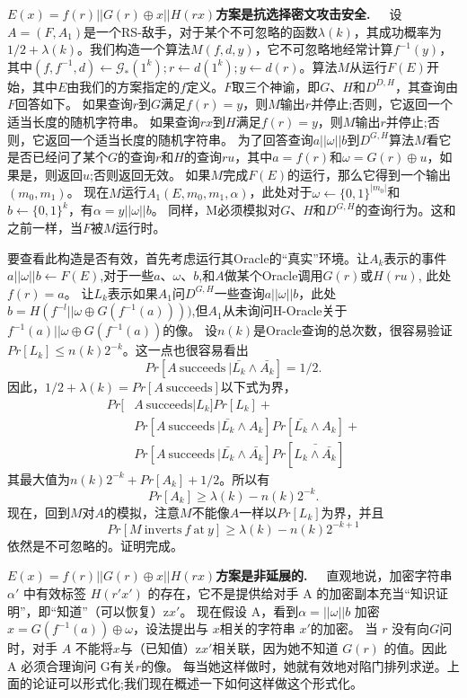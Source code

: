 \documentclass[]{article}
\begin{document}
    \textbf{$E(x)=f(r)||G(r)\oplus x || H(rx)$方案是抗选择密文攻击安全.}\ \ \ 
    设$A = (F, A_1)$是一个RS-敌手，对于某个不可忽略的函数$\lambda(k)$，其成功概率为$1/2 + \lambda(k)$。我们构造一个算法$M(f,d,y)$，它不可忽略地经常计算$f^{-1}(y)$，其中$(f,f^{-1},d)\leftarrow \mathcal{G}_*(1^k);r\leftarrow d(1^k);y\leftarrow d(r)$。算法$M$从运行$F(E)$开始，其中$E$由我们的方案指定的$f$定义。$F$取三个神谕，即$G$、$H$和$D^ {D,H}$，其查询由$F$回答如下。
    如果查询$r$到$G$满足$f(r)=y$，则$M$输出$r$并停止;否则，它返回一个适当长度的随机字符串。
    如果查询$rx$到$H$满足$f(r) = y$，则$M$输出$r$并停止;否则，它返回一个适当长度的随机字符串。
    为了回答查询$a || \omega || b$到$D ^{G,H}$算法$M$看它是否已经问了某个$G$的查询$r$和$H$的查询$ru$，其中$a = f (r)$和$\omega = G(r)\oplus u$，如果是，则返回$u$;否则返回无效。
    如果$M$完成$F(E)$的运行，那么它得到一个输出$(m_0,m_1)$。
    现在$M$运行$A_1(E,m_0,m_1,\alpha)$，此处对于$\omega \leftarrow \{0,1\}^{|m_0|}$和$b\leftarrow \{0,1\}^k$，有$\alpha=y || \omega || b$。
    同样，M必须模拟对$G$、$H$和$D^{G,H}$的查询行为。这和之前一样，当$F$被$M$运行时。
    \par
    
    要查看此构造是否有效，首先考虑运行其Oracle的“真实”环境。让$A_k$表示的事件$a || \omega || b\leftarrow F(E)$,对于一些$a$、$\omega$、$b$,和$A$做某个Oracle调用$G(r)$或$H(ru)$, 此处$f(r)=a$。
    让$L_k$表示如果$A_1$问$D^{G,H}$一些查询$a||\omega||b$，此处 $b = H(f^{-l}|| \omega \oplus G(f^{-1}(a))))$,但$A_1$从未询问H-Oracle关于$f^{-1}(a)||\omega \oplus G(f^{-1}(a))$的像。
    设$n(k)$是Oracle查询的总次数，很容易验证$Pr[L_k]\leq n(k)2^{-k}$。这一点也很容易看出
    \[Pr[A\ \text{succeeds}\ | \bar{L_k} \wedge \bar{A_k} ]=1/2.\]
    因此，$1/2 + \lambda(k) = Pr [A\ \text{succeeds}]$以下式为界，
    \begin{align*}
    	Pr[&A\ \text{succeeds} | L_k] Pr[L_k]+\\
    	   &Pr[A\ \text{succeeds}\ | \bar{L_k} \wedge A_k]Pr[\bar{L_k}\wedge A_k]+\\
    	   &Pr[A\ \text{succeeds}\ | \bar{L_k}\wedge \bar{A_k}]Pr[\bar{L_k\wedge \bar{A_k}}]
    \end{align*}
    其最大值为$n(k)2^{-k}+Pr[A_k]+1/2$。所以有
    \[Pr[A_k]\geq \lambda(k)-n(k)2^{-k}.\]
    现在，回到$M$对$A$的模拟，注意$M$不能像$A$一样以$Pr[L_k]$为界，并且
    \[Pr[M\ \text{inverts}\ f \ \text{at}\ y] \geq \lambda(k)-n(k)2^{-k+1}\]
    依然是不可忽略的。证明完成。
    \par
    
    \textbf{$E(x)=f(r)||G(r)\oplus x || H(rx)$方案是非延展的.}\ \ \ 
    直观地说，加密字符串 $\alpha'$ 中有效标签 $H(r'x')$ 的存在，它不是提供给对手 A 的加密副本充当“知识证明”，即“知道”（可以恢复）z$x'$。
    现在假设 A，看到$\alpha =||\omega || b$ 加密 $x=G(f^{-1}(a))\oplus \omega$，设法提出与 $x$相关的字符串 $x'$的加密。
    当 $r$ 没有向$G$问时，对手 $A$ 不能将$x$与（已知值）z$x'$相关联，因为她不知道 $G(r)$ 的值。因此 A 必须合理询问 G有关$r$的像。
    每当她这样做时，她就有效地对陷门排列求逆。上
    面的论证可以形式化;我们现在概述一下如何这样做这个形式化。
    \par
    
\end{document}
